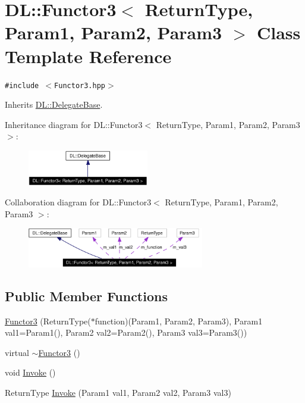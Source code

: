 \hypertarget{classDL_1_1Functor3}{
\section{DL::Functor3$<$ Return\-Type, Param1, Param2, Param3 $>$ Class Template Reference}
\label{classDL_1_1Functor3}
}
{\tt \#include $<$Functor3.hpp$>$}

Inherits \hyperlink{classDL_1_1DelegateBase}{DL::Delegate\-Base}.

Inheritance diagram for DL::Functor3$<$ Return\-Type, Param1, Param2, Param3 $>$:\begin{figure}[H]
\begin{center}
\leavevmode
\includegraphics[width=150pt]{classDL_1_1Functor3__inherit__graph}
\end{center}
\end{figure}
Collaboration diagram for DL::Functor3$<$ Return\-Type, Param1, Param2, Param3 $>$:\begin{figure}[H]
\begin{center}
\leavevmode
\includegraphics[width=219pt]{classDL_1_1Functor3__coll__graph}
\end{center}
\end{figure}
\subsection*{Public Member Functions}
\begin{CompactItemize}
\item 
\hyperlink{classDL_1_1Functor3_a0}{Functor3} (Return\-Type($\ast$function)(Param1, Param2, Param3), Param1 val1=Param1(), Param2 val2=Param2(), Param3 val3=Param3())
\item 
virtual \hyperlink{classDL_1_1Functor3_a1}{$\sim$Functor3} ()
\item 
void \hyperlink{classDL_1_1Functor3_a2}{Invoke} ()
\item 
Return\-Type \hyperlink{classDL_1_1Functor3_a3}{Invoke} (Param1 val1, Param2 val2, Param3 val3)
\end{CompactItemize}
